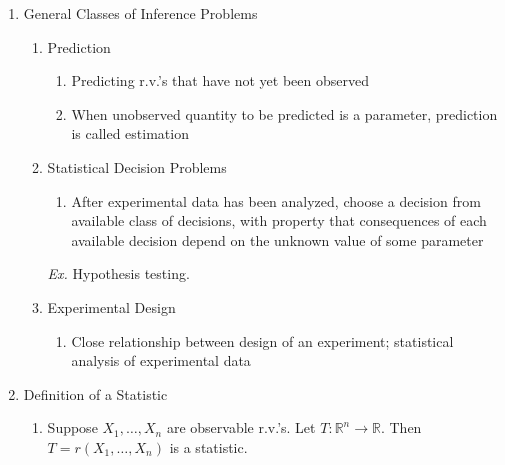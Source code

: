 \documentclass[11pt]{article}
\begin{document}
\begin{enumerate}[label=\Roman*.]
  \item General Classes of Inference Problems
  \begin{enumerate}[label=\Alph*.]
    \item Prediction
    \begin{enumerate}[label=\arabic*.]
      \item Predicting r.v.'s that have not yet been observed
      \item When unobserved quantity to be predicted is a parameter, prediction is called estimation
    \end{enumerate}
    \item Statistical Decision Problems
    \begin{enumerate}[label=\arabic*.]
      \item After experimental data has been analyzed, choose a decision from available class of decisions, with property that consequences of each available decision depend on the unknown value of some parameter
    \end{enumerate}
    \textit{Ex.} Hypothesis testing.
    \item Experimental Design
    \begin{enumerate}[label=\arabic*.]
      \item Close relationship between design of an experiment; statistical analysis of experimental data
    \end{enumerate}
  \end{enumerate}

  \item Definition of a Statistic
  \begin{enumerate}[label=\Alph*.]
    \item Suppose $X_{1},\dots,X_{n}$ are observable r.v.'s. Let $T:\mathbb{R}^{n}\to\mathbb{R}$. Then $T=r(X_{1},\dots,X_{n})$ is a statistic.
  \end{enumerate}
\end{enumerate}
\end{document}
